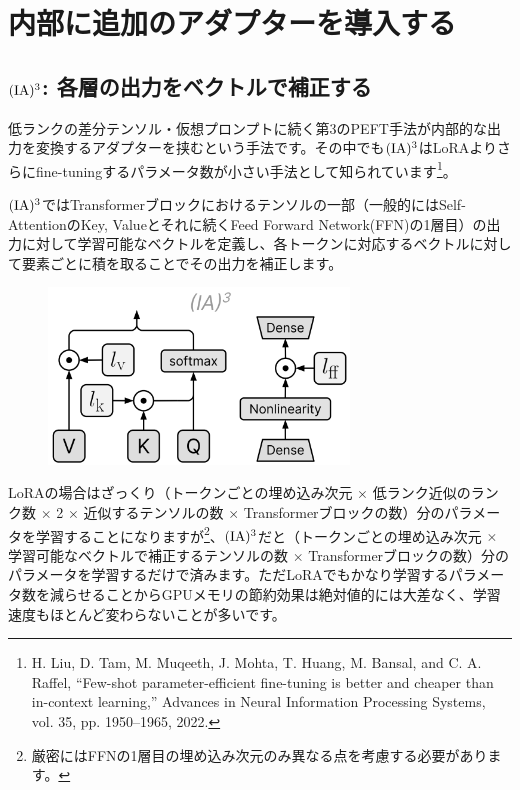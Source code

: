 \documentclass[a5paper,twoside,dvipdfmx]{jsarticle}
\begin{document}
\newpage

\section{内部に追加のアダプターを導入する}

\subsection{$\rm{(IA)^3}$: 各層の出力をベクトルで補正する}

低ランクの差分テンソル・仮想プロンプトに続く第3のPEFT手法が内部的な出力を変換するアダプターを挟むという手法です。その中でも$\rm{(IA)^3}$はLoRAよりさらにfine-tuningするパラメータ数が小さい手法として知られています\footnote{H. Liu, D. Tam, M. Muqeeth, J. Mohta, T. Huang, M. Bansal, and C. A. Raffel, “Few-shot parameter-efficient fine-tuning is better and cheaper than in-context learning,” Advances in Neural Information Processing Systems, vol. 35, pp. 1950–1965, 2022.}。

$\rm{(IA)^3}$ではTransformerブロックにおけるテンソルの一部（一般的にはSelf-AttentionのKey, Valueとそれに続くFeed Forward Network(FFN)の1層目）の出力に対して学習可能なベクトルを定義し、各トークンに対応するベクトルに対して要素ごとに積を取ることでその出力を補正します。


\begin{figure}[h]
  \centering
  \includegraphics[width=80mm]{../C105Fig/gray/ia3_image.png}
 \end{figure} 

LoRAの場合はざっくり（トークンごとの埋め込み次元 $\times$ 低ランク近似のランク数 $\times$ 2 $\times$ 近似するテンソルの数 $\times$ Transformerブロックの数）分のパラメータを学習することになりますが\footnote{厳密にはFFNの1層目の埋め込み次元のみ異なる点を考慮する必要があります。}、$\rm{(IA)^3}$だと（トークンごとの埋め込み次元 $\times$ 学習可能なベクトルで補正するテンソルの数 $\times$ Transformerブロックの数）分のパラメータを学習するだけで済みます。ただLoRAでもかなり学習するパラメータ数を減らせることからGPUメモリの節約効果は絶対値的には大差なく、学習速度もほとんど変わらないことが多いです。
\end{document}
